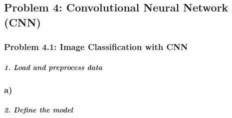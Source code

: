 \documentclass[
]{article}
\newenvironment{Shaded}{\begin{snugshade}}{\end{snugshade}}
\newcommand{\AttributeTok}[1]{\textcolor[rgb]{0.77,0.63,0.00}{#1}}
\newcommand{\DecValTok}[1]{\textcolor[rgb]{0.00,0.00,0.81}{#1}}
\newcommand{\FunctionTok}[1]{\textcolor[rgb]{0.00,0.00,0.00}{#1}}
\newcommand{\NormalTok}[1]{#1}
\newcommand{\OtherTok}[1]{\textcolor[rgb]{0.56,0.35,0.01}{#1}}
\newcommand{\SpecialCharTok}[1]{\textcolor[rgb]{0.00,0.00,0.00}{#1}}
\begin{document}
\hypertarget{problem-4-convolutional-neural-network-cnn}{%
\subsection{Problem 4: Convolutional Neural Network
(CNN)}\label{problem-4-convolutional-neural-network-cnn}}

\hypertarget{problem-4.1-image-classification-with-cnn}{%
\subsubsection{Problem 4.1: Image Classification with
CNN}\label{problem-4.1-image-classification-with-cnn}}

\hypertarget{load-and-preprocess-data-1}{%
\subparagraph{1. Load and preprocess
data}\label{load-and-preprocess-data-1}}

\begin{Shaded}
\end{Shaded}

\hypertarget{a-3}{%
\subsubsection{a)}\label{a-3}}

\hypertarget{define-the-model-1}{%
\subparagraph{2. Define the model}\label{define-the-model-1}}
\end{document}
